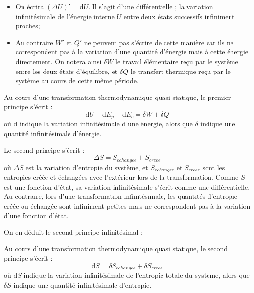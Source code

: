 \documentclass[11pt,fleqn]{book} %
\newcommand{\dd}{\mathrm{d}}
\begin{document}
\begin{solution}
\begin{itemize}
    \item On écrira $(\Delta U)' = \dd U$. Il s'agit d'une différentielle ; la variation infinitésimale de l'énergie interne $U$ entre deux états successifs infiniment proches;
    \item Au contraire $W'$ et $Q'$ ne peuvent pas s'écrire de cette manière car ils ne correspondent pas à la variation d'une quantité d'énergie mais à cette énergie directement. On notera ainsi $\delta W$ le travail élémentaire reçu par le système entre les deux états d'équilibre, et $\delta Q$ le transfert thermique reçu par le système au cours de cette même période. 
\end{itemize}

\begin{theorem}
    Au cours d'une transformation thermodynamique quasi statique, le premier principe s'écrit :
    \begin{equation}
        \dd U + \dd E_p + \dd E_c = \delta W + \delta Q
    \end{equation}
    où $\dd$ indique la variation infinitésimale d'une énergie, alors que $\delta$ indique une quantité infinitésimale d'énergie.
\end{theorem}

Le second principe s'écrit :
\begin{equation}
    \Delta S = S_{echangee} + S_{creee}
\end{equation}
où $\Delta S$ est la variation d'entropie du système, et $S_{echangee}$ et $S_{creee}$ sont les entropies créée et échangées avec l'extérieur lors de la transformation. Comme $S$ est une fonction d'état, sa variation infinitésimale s'écrit comme une différentielle. Au contraire, lors d'une transformation infinitésimale, les quantités d'entropie créée ou échangée sont infiniment petites mais ne correspondent pas à la variation d'une fonction d'état. 

On en déduit le second principe infinitésimal :
\begin{theorem}
    Au cours d'une transformation thermodynamique quasi statique, le second principe s'écrit :
    \begin{equation}
        \dd S = \delta S _{echangee}+ \delta S_{creee}
    \end{equation}
    où $\dd S$ indique la variation infinitésimale de l'entropie totale du système, alors que $\delta S$ indique une quantité infinitésimale d'entropie.
\end{theorem}

\end{solution}
\end{document}
